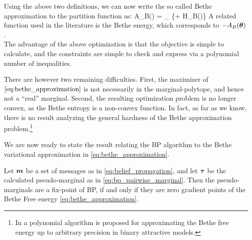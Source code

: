 

Using the above two definitions, we can now write the so called Bethe approximation to the partition function as:
\be
\label{eq:bethe_approximation}
A_B(\thetav) = \sup_{\tauv \in \lclmargpoly} \left\{\thetav \cdot \tauv + H_B(\tauv)\right\}
\ee
A related function used in the literature is the Bethe energy, which corresponds to $-A_B(\boldsymbol{\theta})$.\\

The advantage of the above optimization is that the objective is simple to calculate, and the constraints are simple to check and express via
a polynomial number of inequalities. 

There are however two remaining difficulties. First, the maximizer of $\eqref{eq:bethe_approximation}$ is not necessarily in the marginal-polytope, and hence not a ``real'' marginal. Second, the resulting optimization problem is no longer convex, as the Bethe entropy is a non-convex function.
In fact,  as far as we know, there is no result analyzing the general hardness of the Bethe approximation problem.\footnote{In  \cite{weller2012bethe} a polynomial algorithm is proposed for approximating the Bethe free energy up to arbitrary precision in binary attractive models.}

We are now ready to state the result relating the BP algorithm to the Bethe variational approximation in \eqref{eq:bethe_approximation}.
\begin{claim}  \cite{yedidia2000generalized}
\label{thm:bp_bethe}
Let  $\boldsymbol{m}$ be a set of messages as in \eqref{eq:belief_propagation}, and let $\boldsymbol{\tau}$ be the calculated pseudo-marginal as in \eqref{eq:bp_pairwise_marginal}.
Then the pseudo-marginals are a fix-point of BP, if and only if they are zero gradient points of the Bethe Free energy \eqref{eq:bethe_approximation}.
\end{claim}

